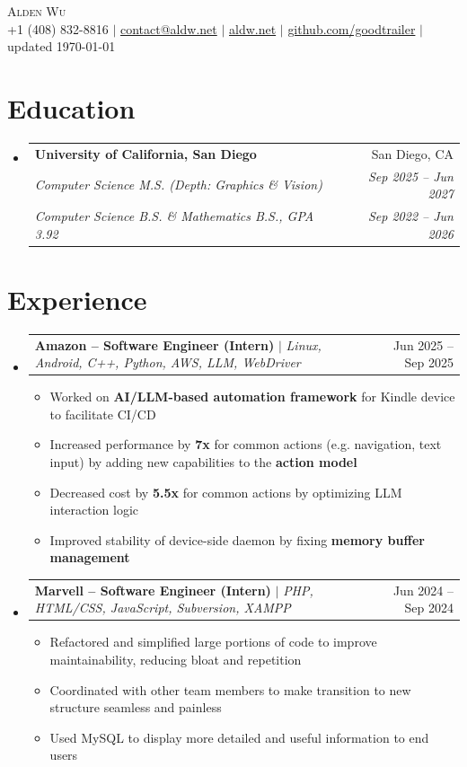 \documentclass[letterpaper,11pt]{article}
\makeatletter
\newcommand{\resumeItem}[1]{
  \item\small{
    {#1 \vspace{-2pt}}
  }
}
\newcommand{\resumeSubheadingMS}[6]{
  \vspace{-2pt}\item
    \begin{tabular*}{0.97\textwidth}[t]{l@{\extracolsep{\fill}}r}
      \textbf{#1} & #2 \\
      \textit{\small#3} & \textit{\small #4} \\
      \textit{\small#5} & \textit{\small #6} \\
    \end{tabular*}\vspace{-7pt}
}
\newcommand{\resumeProjectHeading}[2]{
    \item
    \begin{tabular*}{0.97\textwidth}{l@{\extracolsep{\fill}}r}
      \small#1 & #2 \\
    \end{tabular*}\vspace{-7pt}
}
\newcommand{\resumeSubHeadingListStart}{\begin{itemize}[leftmargin=0.15in, label={}]}
\newcommand{\resumeSubHeadingListEnd}{\end{itemize}}
\newcommand{\resumeItemListStart}{\begin{itemize}}
\newcommand{\resumeItemListEnd}{\end{itemize}\vspace{-5pt}}
\makeatother
\begin{document}

\begin{center}
    {\huge \scshape Alden Wu} \\[0.2em]
    \small
    +1 (408) 832-8816 $\mid$
    \href{mailto:contact@aldw.net}{contact@aldw.net} $\mid$
    \href{https://aldw.net/projects}{aldw.net} $\mid$
    \href{https://github.com/goodtrailer}{github.com/goodtrailer} $\mid$
    updated \today
\end{center}

\section{Education}
    \resumeSubHeadingListStart
        \resumeSubheadingMS
            {University of California, San Diego}{San Diego, CA}
            {Computer Science M.S. (Depth: Graphics \& Vision)}{Sep 2025 -- Jun 2027}
            {Computer Science B.S. \& Mathematics B.S., GPA 3.92}{Sep 2022 -- Jun 2026}
    \resumeSubHeadingListEnd

\section{Experience}
    \resumeSubHeadingListStart
        \resumeProjectHeading
            {\textbf{Amazon -- Software Engineer (Intern)} $\mid$ \emph{Linux, Android, C++, Python, AWS, LLM, WebDriver}}{Jun 2025 -- Sep 2025}
            \resumeItemListStart
                \resumeItem{Worked on \textbf{AI/LLM-based automation framework} for Kindle device to facilitate CI/CD}
                \resumeItem{Increased performance by \textbf{7x} for common actions (e.g. navigation, text input) by adding new capabilities to the \textbf{action model}}
                \resumeItem{Decreased cost by \textbf{5.5x} for common actions by optimizing LLM interaction logic}
                \resumeItem{Improved stability of device-side daemon by fixing \textbf{memory buffer management}}
            \resumeItemListEnd
        \resumeProjectHeading
            {\textbf{Marvell -- Software Engineer (Intern)} $\mid$ \emph{PHP, HTML/CSS, JavaScript, Subversion, XAMPP}}{Jun 2024 -- Sep 2024}
            \resumeItemListStart
                \resumeItem{Refactored and simplified large portions of code to improve maintainability, reducing bloat and repetition}
                \resumeItem{Coordinated with other team members to make transition to new structure seamless and painless}
                \resumeItem{Used MySQL to display more detailed and useful information to end users}
            \resumeItemListEnd
    \resumeSubHeadingListEnd
\end{document}
